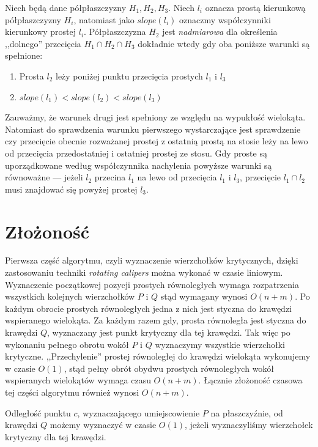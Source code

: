 \begin{lemat}
  Niech będą dane półpłaszczyzny $H_1, H_2, H_3$. Niech $l_i$ oznacza
  prostą kierunkową półpłaszczyzny $H_i$, natomiast jako $slope(l_i)$
  oznaczmy współczynniki kierunkowy prostej $l_i$. Półpłaszczyzna
  $H_2$ jest \emph{nadmiarowa} dla określenia ,,dolnego'' przecięcia
  $H_1 \cap H_2 \cap H_3$ dokładnie wtedy gdy oba poniższe warunki są
  spełnione:

  \begin{enumerate}
    \item Prosta $l_2$ leży poniżej punktu przecięcia prostych $l_1$ i
      $l_3$
    \item $slope(l_1) < slope(l_2) < slope(l_3)$
  \end{enumerate}
\end{lemat}

Zauważmy, że warunek drugi jest spełniony ze względu na wypukłość
wielokąta. Natomiast do sprawdzenia warunku pierwszego wystarczające
jest sprawdzenie czy przecięcie obecnie rozważanej prostej z ostatnią
prostą na stosie leży na lewo od przecięcia przedostatniej i ostatniej
prostej ze stosu. Gdy proste są uporządkowane według współczynnika
nachylenia powyższe warunki są równoważne --- jeżeli $l_2$ przecina
$l_1$ na lewo od przecięcia $l_1$ i $l_3$, przecięcie $l_1 \cap l_2$
musi znajdować się powyżej prostej $l_3$.

\section{Złożoność}
Pierwsza część algorytmu, czyli wyznaczenie wierzchołków krytycznych,
dzięki zastosowaniu techniki \emph{rotating calipers} można wykonać w
czasie liniowym. Wyznaczenie początkowej pozycji prostych równoległych
wymaga rozpatrzenia wszystkich kolejnych wierzchołków $P$ i $Q$ stąd
wymagany wynosi $O(n + m)$. Po każdym obrocie prostych równoległych
jedna z nich jest styczna do krawędzi wspieranego wielokąta. Za każdym
razem gdy, prosta równoległa jest styczna do krawędzi $Q$, wyznaczany
jest punkt krytyczny dla tej krawędzi. Tak więc po wykonaniu pełnego
obrotu wokół $P$ i $Q$ wyznaczymy wszystkie wierzchołki
krytyczne. ,,Przechylenie'' prostej równoległej do krawędzi wielokąta
wykonujemy w czasie $O(1)$, stąd pełny obrót obydwu prostych
równoległych wokół wspieranych wielokątów wymaga czasu $O(n + m)$.
Łącznie złożoność czasowa tej części algorytmu również wynosi $O(n +
m)$.

Odległość punktu $c$, wyznaczającego umiejscowienie $P$ na
płaszczyźnie, od krawędzi $Q$ możemy wyznaczyć w czasie $O(1)$, jeżeli
wyznaczyliśmy wierzchołek krytyczny dla tej krawędzi.

